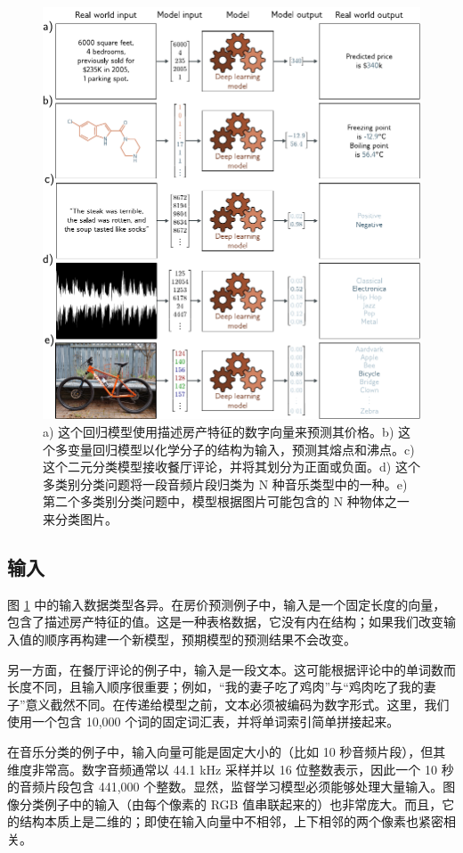 \documentclass[lang=cn,newtx,10pt,scheme=chinese]{elegantbook}
\begin{document}
\begin{figure}
	\centering
	\includegraphics[width=0.7\linewidth]{PDFFigures/UDLChap1PDF/IntroModels.pdf}
	\caption{a) 这个回归模型使用描述房产特征的数字向量来预测其价格。b) 这个多变量回归模型以化学分子的结构为输入，预测其熔点和沸点。c) 这个二元分类模型接收餐厅评论，并将其划分为正面或负面。d) 这个多类别分类问题将一段音频片段归类为 N 种音乐类型中的一种。e) 第二个多类别分类问题中，模型根据图片可能包含的 N 种物体之一来分类图片。}
    \label{IntroModels}
\end{figure}

\subsection{输入}

图 \ref{IntroModels} 中的输入数据类型各异。在房价预测例子中，输入是一个固定长度的向量，包含了描述房产特征的值。这是一种表格数据，它没有内在结构；如果我们改变输入值的顺序再构建一个新模型，预期模型的预测结果不会改变。

另一方面，在餐厅评论的例子中，输入是一段文本。这可能根据评论中的单词数而长度不同，且输入顺序很重要；例如，“我的妻子吃了鸡肉”与“鸡肉吃了我的妻子”意义截然不同。在传递给模型之前，文本必须被编码为数字形式。这里，我们使用一个包含 10,000 个词的固定词汇表，并将单词索引简单拼接起来。

在音乐分类的例子中，输入向量可能是固定大小的（比如 10 秒音频片段），但其维度非常高。数字音频通常以 44.1 kHz 采样并以 16 位整数表示，因此一个 10 秒的音频片段包含 441,000 个整数。显然，监督学习模型必须能够处理大量输入。图像分类例子中的输入（由每个像素的 RGB 值串联起来的）也非常庞大。而且，它的结构本质上是二维的；即使在输入向量中不相邻，上下相邻的两个像素也紧密相关。
\end{document}
